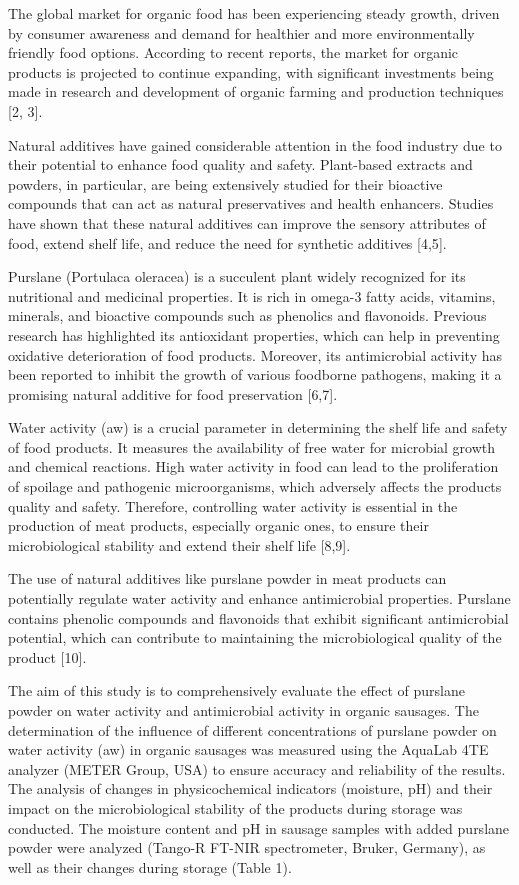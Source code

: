 The global market for organic food has been experiencing steady growth,
driven by consumer awareness and demand for healthier and more
environmentally friendly food options. According to recent reports, the
market for organic products is projected to continue expanding, with
significant investments being made in research and development of
organic farming and production techniques {[}2, 3{]}.

Natural additives have gained considerable attention in the food
industry due to their potential to enhance food quality and safety.
Plant-based extracts and powders, in particular, are being extensively
studied for their bioactive compounds that can act as natural
preservatives and health enhancers. Studies have shown that these
natural additives can improve the sensory attributes of food, extend
shelf life, and reduce the need for synthetic additives {[}4,5{]}.

Purslane (Portulaca oleracea) is a succulent plant widely recognized for
its nutritional and medicinal properties. It is rich in omega-3 fatty
acids, vitamins, minerals, and bioactive compounds such as phenolics and
flavonoids. Previous research has highlighted its antioxidant
properties, which can help in preventing oxidative deterioration of food
products. Moreover, its antimicrobial activity has been reported to
inhibit the growth of various foodborne pathogens, making it a promising
natural additive for food preservation {[}6,7{]}.

Water activity (aw) is a crucial parameter in determining the shelf life
and safety of food products. It measures the availability of free water
for microbial growth and chemical reactions. High water activity in food
can lead to the proliferation of spoilage and pathogenic microorganisms,
which adversely affects the product\textquotesingle s quality and
safety. Therefore, controlling water activity is essential in the
production of meat products, especially organic ones, to ensure their
microbiological stability and extend their shelf life {[}8,9{]}.

The use of natural additives like purslane powder in meat products can
potentially regulate water activity and enhance antimicrobial
properties. Purslane contains phenolic compounds and flavonoids that
exhibit significant antimicrobial potential, which can contribute to
maintaining the microbiological quality of the product {[}10{]}.

The aim of this study is to comprehensively evaluate the effect of
purslane powder on water activity and antimicrobial activity in organic
sausages. The determination of the influence of different concentrations
of purslane powder on water activity (aw) in organic sausages was
measured using the AquaLab 4TE analyzer (METER Group, USA) to ensure
accuracy and reliability of the results. The analysis of changes in
physicochemical indicators (moisture, pH) and their impact on the
microbiological stability of the products during storage was conducted.
The moisture content and pH in sausage samples with added purslane
powder were analyzed (Tango-R FT-NIR spectrometer, Bruker, Germany), as
well as their changes during storage (Table 1).

